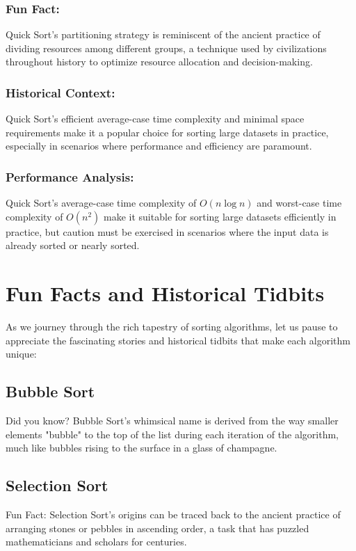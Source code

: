 \documentclass{article}
\begin{document}
\subsubsection{Fun Fact:}
Quick Sort's partitioning strategy is reminiscent of the ancient practice of dividing resources among different groups, a technique used by civilizations throughout history to optimize resource allocation and decision-making.

\subsubsection{Historical Context:}
Quick Sort's efficient average-case time complexity and minimal space requirements make it a popular choice for sorting large datasets in practice, especially in scenarios where performance and efficiency are paramount.

\subsubsection{Performance Analysis:}
Quick Sort's average-case time complexity of \(O(n \log n)\) and worst-case time complexity of \(O(n^2)\) make it suitable for sorting large datasets efficiently in practice, but caution must be exercised in scenarios where the input data is already sorted or nearly sorted.

\section{Fun Facts and Historical Tidbits}

As we journey through the rich tapestry of sorting algorithms, let us pause to appreciate the fascinating stories and historical tidbits that make each algorithm unique:

\subsection{Bubble Sort}
Did you know? Bubble Sort's whimsical name is derived from the way smaller elements "bubble" to the top of the list during each iteration of the algorithm, much like bubbles rising to the surface in a glass of champagne.

\subsection{Selection Sort}
Fun Fact: Selection Sort's origins can be traced back to the ancient practice of arranging stones or pebbles in ascending order, a task that has puzzled mathematicians and scholars for centuries.
\end{document}

